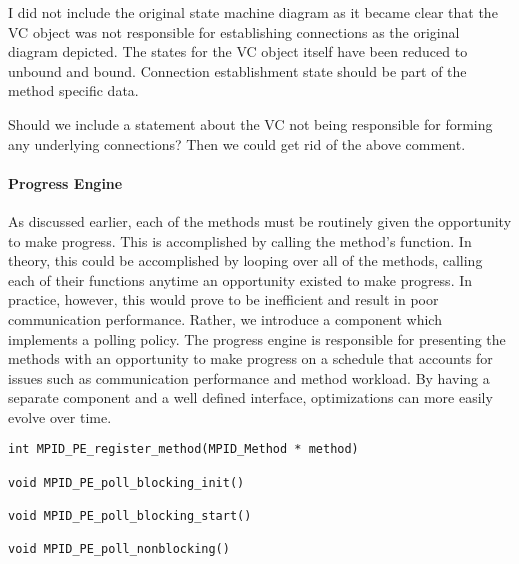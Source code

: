 \begin{cmt}[BRT]
  I did not include the original state machine diagram as it became clear that
  the VC object was not responsible for establishing connections as the
  original diagram depicted.  The states for the VC object itself have been
  reduced to unbound and bound.  Connection establishment state should be part
  of the method specific data.
\end{cmt}

\Q Should we include a statement about the VC not being responsible for forming
any underlying connections?  Then we could get rid of the above comment.


\paragraph{Progress Engine}


As discussed earlier, each of the methods must be routinely given the
opportunity to make progress.  This is accomplished by calling the method's
 function.  In theory, this could be accomplished by looping over
all of the methods, calling each of their  functions anytime an
opportunity existed to make progress.  In practice, however, this would prove
to be inefficient and result in poor communication performance.  Rather, we
introduce a  component which implements a polling policy.
The progress engine is responsible for presenting the methods with an
opportunity to make progress on a schedule that accounts for issues such as
communication performance and method workload.  By having a separate component
and a well defined interface, optimizations can more easily evolve over time.

\begin{verbatim}
int MPID_PE_register_method(MPID_Method * method)

void MPID_PE_poll_blocking_init()

void MPID_PE_poll_blocking_start()

void MPID_PE_poll_nonblocking()
\end{verbatim}

